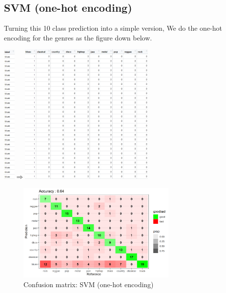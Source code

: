 \documentclass[12pt,a4paper]{article}
\begin{document}
\subsection{SVM (one-hot encoding)}
Turning this 10 class prediction into a simple version, We do the one-hot encoding for the genres as the figure down below.
\begin{center}
    \includegraphics[width=0.043\textwidth]{y.jpg}$\Longrightarrow$\includegraphics[width=0.5\textwidth]{y_matrix.jpg}
\end{center}
\newpage
\begin{figure}[h]
    \begin{center}
        \includegraphics[width=0.7\textwidth]{confusionMatrix_ohencoding_std.png}
    \end{center}
    \caption{Confusion matrix: SVM (one-hot encoding)}
\end{figure}
\end{document}
